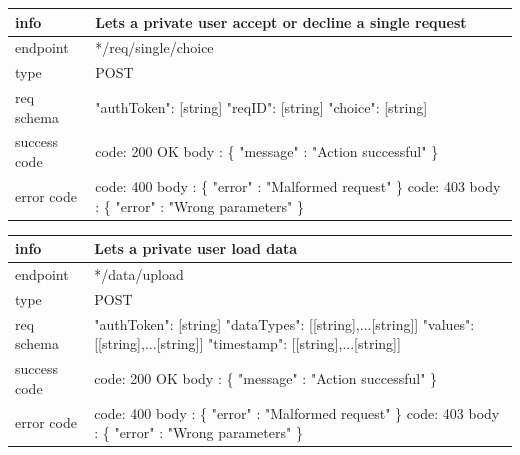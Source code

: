 \documentclass[titlepage]{article}
\begin{document}
\vspace{\baselineskip}

\begin{tabularx}{\textwidth}{lX} \hline
    info & Lets a private user accept or decline a single request \\ \hline
    endpoint & */req/single/choice \\ \hline
    type & POST \\ \hline
    req schema & 
    "authToken": [string] \newline
    "reqID": [string] \newline
    "choice": [string] \\ \hline
    success code &
        code: 200 OK \newline \newline 
        body : \{ \newline
        "message" : "Action successful" \newline
        \} \\ \hline
    error code &
        code: 400 \newline
        body : \{ "error" : "Malformed request" \} \newline \newline
        code: 403 \newline
        body : \{ "error" : "Wrong parameters" \}
\end{tabularx}
		
\vspace{\baselineskip}

\begin{tabularx}{\textwidth}{lX} \hline
    info & Lets a private user load data \\ \hline
    endpoint & */data/upload \\ \hline
    type & POST \\ \hline
    req schema & 
    "authToken": [string] \newline
    "dataTypes": [[string],...[string]] \newline
    "values": [[string],...[string]] \newline
    "timestamp": [[string],...[string]] \\ \hline
    success code &
        code: 200 OK \newline \newline 
        body : \{ \newline
        "message" : "Action successful" \newline
        \} \\ \hline
    error code &
        code: 400 \newline
        body : \{ "error" : "Malformed request" \} \newline \newline
        code: 403 \newline
        body : \{ "error" : "Wrong parameters" \}
\end{tabularx}
		
\end{document}
